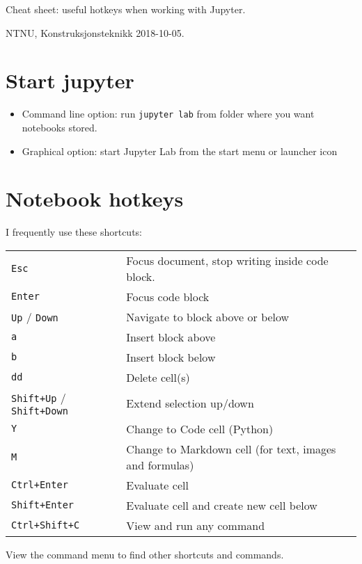 \documentclass[11pt]{article}
\author{Teodor Heggelund}
\date{\today}
\title{}
\begin{document}
\tableofcontents

Cheat sheet: useful hotkeys when working with Jupyter.

NTNU, Konstruksjonsteknikk 2018-10-05.

\section{Start jupyter}
\label{sec:org7b27ea6}
\begin{itemize}
\item Command line option: run \texttt{jupyter lab} from folder where you want notebooks stored.
\item Graphical option: start Jupyter Lab from the start menu or launcher icon
\end{itemize}
\section{Notebook hotkeys}
\label{sec:org20860f3}
I frequently use these shortcuts:

\begin{center}
\begin{tabular}{ll}
\texttt{Esc} & Focus document, stop writing inside code block.\\
\texttt{Enter} & Focus code block\\
\texttt{Up} / \texttt{Down} & Navigate to block above or below\\
\texttt{a} & Insert block above\\
\texttt{b} & Insert block below\\
\texttt{dd} & Delete cell(s)\\
\texttt{Shift+Up} / \texttt{Shift+Down} & Extend selection up/down\\
\texttt{Y} & Change to Code cell (Python)\\
\texttt{M} & Change to Markdown cell (for text, images and formulas)\\
\texttt{Ctrl+Enter} & Evaluate cell\\
\texttt{Shift+Enter} & Evaluate cell and create new cell below\\
\texttt{Ctrl+Shift+C} & View and run any command\\
\end{tabular}
\end{center}

View the command menu to find other shortcuts and commands.
\end{document}
